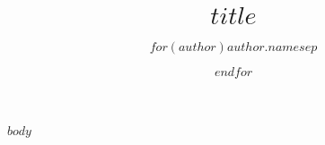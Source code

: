\documentclass[man,floatsintext,12pt]{apa7}
\title{$title$}
\author{$for(author)$$author.name$$sep$ \and $endfor$}
\affiliation{$for(author)$$author.affiliation$$sep$ \and $endfor$}
\begin{document}
$body$
\end{document}
